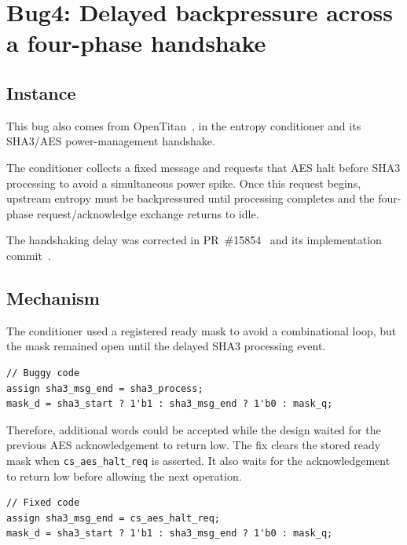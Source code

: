 \documentclass[conference]{IEEEtran}
\newcommand{\bugsection}[2]{%
  \refstepcounter{section}%
  \setcounter{subsection}{0}%
  \section*{Bug#1: #2}%
}
\begin{document}

\bugsection{4}{Delayed backpressure across a four-phase handshake}




\subsection{Instance}

This bug also comes from OpenTitan~\cite{opentitan}, in the entropy conditioner
and its SHA3/AES power-management handshake.

The conditioner collects a fixed message and requests that AES halt before
SHA3 processing to avoid a simultaneous power spike. Once this request begins,
upstream entropy must be backpressured until processing completes and the
four-phase request/acknowledge exchange returns to idle.

The handshaking delay was corrected in PR~\#15854~\cite{handshake-fix} and its
implementation commit~\cite{handshake-fix-commit}.




\subsection{Mechanism}

The conditioner used a registered ready mask to avoid a combinational loop,
but the mask remained open until the delayed SHA3 processing event.

\begin{lstlisting}
// Buggy code
assign sha3_msg_end = sha3_process;
mask_d = sha3_start ? 1'b1 : sha3_msg_end ? 1'b0 : mask_q;
\end{lstlisting}

Therefore, additional words could be accepted while the design waited for the
previous AES acknowledgement to return low. The fix clears the stored ready
mask when \texttt{cs\_aes\_halt\_req} is asserted. It also waits for the
acknowledgement to return low before allowing the next operation.

\begin{lstlisting}
// Fixed code
assign sha3_msg_end = cs_aes_halt_req;
mask_d = sha3_start ? 1'b1 : sha3_msg_end ? 1'b0 : mask_q;
\end{lstlisting}
\end{document}
